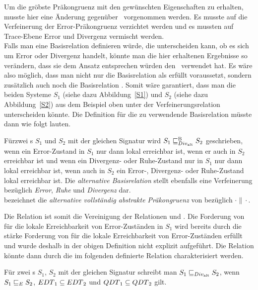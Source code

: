 Um die gröbste Präkongruenz mit den gewünschten Eigenschaften zu erhalten,
musste hier eine Änderung gegenüber~\cite{Chilton2013} vorgenommen werden. Es
musste auf die Verfeinerung der Error-Präkongruenz verzichtet werden und es
mussten auf Trace-Ebene Error und Divergenz vermischt werden.\\
Falls man eine Basisrelation definieren würde, die unterscheiden kann, ob es
sich um Error oder Divergenz handelt, könnte man die hier erhaltenen
Ergebnisse so verändern, dass sie dem Ansatz entsprechen würden
den~\cite{Chilton2013} verwendet hat. Es wäre also möglich, dass man nicht nur
die Basisrelation \DBRel{} als erfüllt voraussetzt, sondern zusätzlich auch
noch die Basisrelation \EBRel{}. Somit wäre garantiert, dass man die beiden
Systeme $S_1$ (siehe dazu Abbildung~\ref{S1}) und $S_2$ (siehe dazu
Abbildung~\ref{S2}) aus dem Beispiel oben unter der Verfeinerungsrelation
unterscheiden könnte. Die Definition für die zu verwendende Basisrelation
müsste dann wie folgt lauten.

\begin{Def}
  Für\linebreak zwei \EIO{}s $S_1$ und $S_2$ mit der gleichen Signatur wird $S_1\sqsubseteq _{Div_{\mathrm{alt}}}^\mathrm{B}{}
  S_2$ geschrieben, wenn ein Error-Zustand in $S_1$ nur dann lokal erreichbar
  ist, wenn er auch in $S_2$ erreichbar ist und wenn ein Divergenz- oder
  Ruhe-Zustand nur in $S_1$ nur dann lokal erreichbar ist, wenn auch in $S_2$ ein
  Error-, Divergenz- oder Ruhe-Zustand lokal erreichbar ist. Die
  \emph{alternative Basisrelation} stellt ebenfalls eine Verfeinerung bezüglich
  \emph{Error}, \emph{Ruhe} und \emph{Divergenz} dar.\\
  \DCaRel{} bezeichnet die \emph{alternative vollständig abstrakte
  Präkongruenz} von \DBaRel{} bezüglich $\cdot\|\cdot$.
\end{Def}

Die Relation \DBaRel{} ist somit die Vereinigung der Relationen \EBRel{} und
\DBRel{}. Die Forderung von \DBRel{} für die lokale Erreichbarkeit von
Error-Zuständen in $S_1$ wird bereits durch die stärke Forderung von \EBRel{}
für die lokale Erreichbarkeit von Error-Zuständen erfüllt und
wurde deshalb in der obigen Definition nicht explizit aufgeführt. Die Relation
\DCaRel{} könnte dann durch die im folgenden definierte Relation charakterisiert
werden.

\begin{Def}
  Für zwei \EIO{}s $S_1$, $S_2$ mit der gleichen Signatur schreibt
  man\linebreak
  $S_1\sqsubseteq _{Div_{\mathrm{alt}}}{} S_2$, wenn $S_1 \sqsubseteq _E{} S_2$, $EDT{}_1\subseteq
  EDT{}_2$ und $QDT{}_1\subseteq QDT{}_2$ gilt.
\end{Def}

